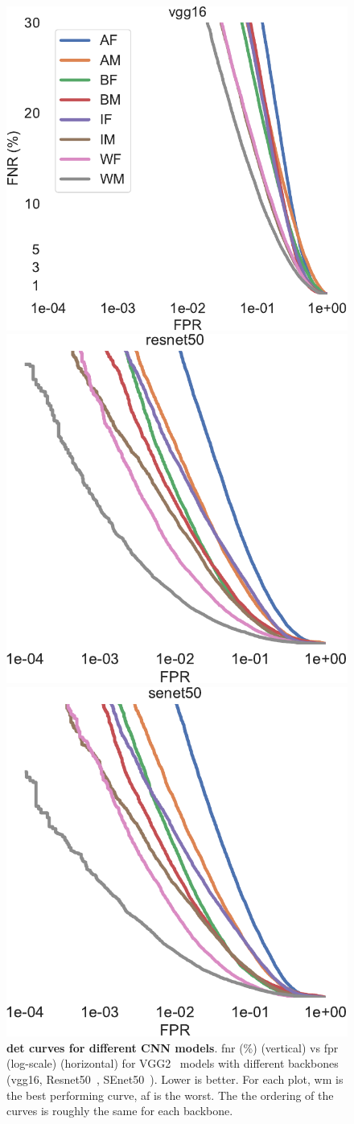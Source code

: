\begin{figure}[h!]
\vspace{-1mm}
    \centering
    \begin{subfig}
    \includegraphics[width=.3\linewidth]{figures/curve_vgg16_subgroups-crop.pdf}
    \end{subfig}
    \begin{subfig}
    \includegraphics[width=.28\linewidth]{figures/curve_resnet50_subgroups-crop.pdf}
    \end{subfig}
        \begin{subfig}
    \includegraphics[width=.28\linewidth]{figures/curve_senet50_subgroups-crop.pdf}
    \end{subfig}
    \caption{\textbf{\gls{det} curves for different CNN models}. \gls{fnr} (\%) (vertical) vs \gls{fpr} (log-scale)  (horizontal) for VGG2~\cite{Cao18} models with different backbones (vgg16, Resnet50~\cite{he2016deep}, SEnet50~\cite{hu2018squeeze}). Lower is better. For each plot, \gls{wm} is the best performing curve, \gls{af} is the worst. The the ordering of the curves is roughly the same for each backbone.}\label{fig:sdm-appendix-a}
    \vspace{-1mm}
\end{figure}



